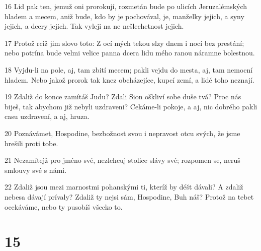 \par 16 Lid pak ten, jemuž oni prorokují, rozmetán bude po ulicích Jeruzalémských hladem a mecem, aniž bude, kdo by je pochovával, je, manželky jejich, a syny jejich, a dcery jejich. Tak vyleji na ne nešlechetnost jejich.
\par 17 Protož rciž jim slovo toto: Z ocí mých tekou slzy dnem i nocí bez prestání; nebo potrína bude velmi velice panna dcera lidu mého ranou náramne bolestnou.
\par 18 Vyjdu-li na pole, aj, tam zbití mecem; pakli vejdu do mesta, aj, tam nemocní hladem. Nebo jakož prorok tak knez obcházejíce, kupcí zemí, a lidé toho neznají.
\par 19 Zdaliž do konce zamítáš Judu? Zdali Sion oškliví sobe duše tvá? Proc nás biješ, tak abychom již nebyli uzdraveni? Cekáme-li pokoje, a aj, nic dobrého pakli casu uzdravení, a aj, hruza.
\par 20 Poznávámet, Hospodine, bezbožnost svou i nepravost otcu svých, že jsme hrešili proti tobe.
\par 21 Nezamítejž pro jméno své, nezlehcuj stolice slávy své; rozpomen se, neruš smlouvy své s námi.
\par 22 Zdaliž jsou mezi marnostmi pohanskými ti, kteríž by déšt dávali? A zdaliž nebesa dávají prívaly? Zdaliž ty nejsi sám, Hospodine, Buh náš? Protož na tebet ocekáváme, nebo ty pusobíš všecko to.

\chapter{15}

